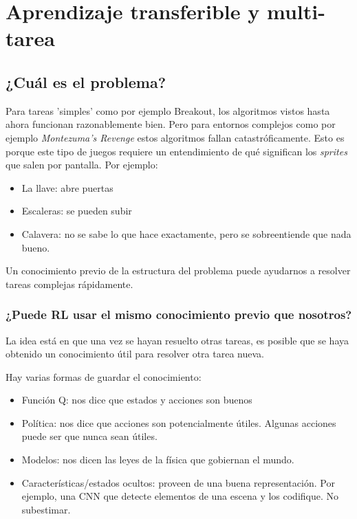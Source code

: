 \chapter{Aprendizaje transferible y multi-tarea}%
\label{cha:aprendizaje_transferible_y_multi_tarea}


\section{¿Cuál es el problema?}%
\label{sec:_cuál_es_el_problema_}

Para tareas 'simples' como por ejemplo Breakout, los algoritmos vistos hasta ahora funcionan
razonablemente bien. Pero para entornos complejos como por ejemplo \textit{Montezuma's
Revenge} estos algoritmos fallan catastróficamente. Esto es porque este tipo de juegos requiere
un entendimiento de qué significan los \textit{sprites} que salen por pantalla. Por
ejemplo:
\begin{itemize}
    \item La llave: abre puertas
    \item Escaleras: se pueden subir
    \item Calavera: no se sabe lo que hace exactamente, pero se sobreentiende que
        nada bueno.
\end{itemize}
Un conocimiento previo de la estructura del problema puede ayudarnos a resolver tareas
complejas rápidamente.

\subsection{¿Puede RL usar el mismo conocimiento previo que nosotros?}%
\label{sub:_puede_rl_usar_el_mismo_conocimiento_previo_que_nosotros_}

La idea está en que una vez se hayan resuelto otras tareas, es posible que se haya obtenido un
conocimiento útil para resolver otra tarea nueva.

Hay varias formas de guardar el conocimiento:
\begin{itemize}
    \item Función Q: nos dice que estados y acciones son buenos
    \item Política: nos dice que acciones son potencialmente útiles. Algunas acciones puede ser
        que nunca sean útiles.
    \item Modelos: nos dicen las leyes de la física que gobiernan el mundo.
    \item Características/estados ocultos: proveen de una buena representación. Por
        ejemplo, una CNN que detecte elementos de una escena y los codifique. No
        subestimar.
\end{itemize}

